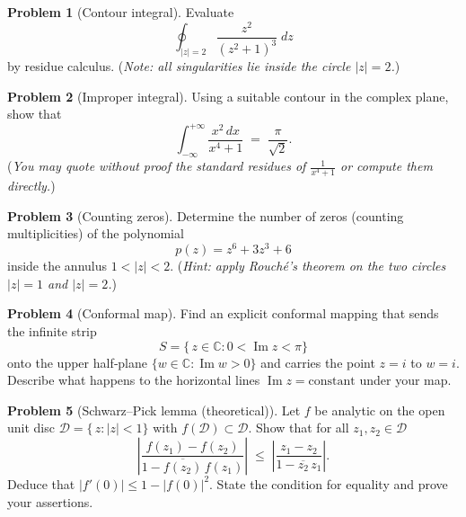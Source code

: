 \documentclass[12pt]{article}
\theoremstyle{definition} %
\newtheorem{problem}{Problem}
\theoremstyle{plain} %
\begin{document}
  \pagebreak
  \begin{problem}[Contour integral]
  Evaluate
  \[
  \oint_{\lvert z\rvert = 2}\frac{z^{2}}{(z^{2}+1)^{3}}\;dz
  \]
  by residue calculus.  (\emph{Note: all singularities lie inside the
  circle $\lvert z\rvert=2$.})
  \end{problem}
  
  \pagebreak
  \begin{problem}[Improper integral]
  Using a suitable contour in the complex plane, show that
  \[
  \int_{-\infty}^{+\infty}\frac{x^{2}\,dx}{x^{4}+1}\;=\;\frac{\pi}{\sqrt{2}}.
  \]
  (\emph{You may quote without proof the standard residues of
  $\displaystyle \frac{1}{x^{4}+1}$ or compute them directly.})
  \end{problem}
  
  \pagebreak
  \begin{problem}[Counting zeros]
  Determine the number of zeros (counting multiplicities) of the
  polynomial
  \[
  p(z)=z^{6}+3z^{3}+6
  \]
  inside the annulus $1<\lvert z\rvert<2$.
  (\emph{Hint: apply Rouché’s theorem on the two circles
  $\lvert z\rvert=1$ and $\lvert z\rvert=2$.})
  \end{problem}
  
  \pagebreak

  \begin{problem}[Conformal map]
  Find an explicit conformal mapping that sends the infinite strip
  \[
  S=\{\,z\in\mathbb{C} : 0<\operatorname{Im}z<\pi\}
  \]
  onto the upper half‑plane
  $\{w\in\mathbb{C}:\operatorname{Im}w>0\}$ and carries the point $z=i$ to
  $w=i$.  Describe what happens to the horizontal lines
  $\operatorname{Im}z=\text{constant}$ under your map.
  \end{problem}
  \pagebreak 
  \begin{problem}[Schwarz–Pick lemma (theoretical)]
  Let $f$ be analytic on the open unit disc $\mathcal{D}=\{\,z:\lvert z\rvert<1\}$
  with $f(\mathcal{D})\subset\mathcal{D}$.  Show that for all $z_{1},z_{2}\in\mathcal{D}$
  \[
  \left|\frac{f(z_{1})-f(z_{2})}{1-\overline{f(z_{2})}\,f(z_{1})}\right|
  \;\le\;
  \left|\frac{z_{1}-z_{2}}{1-\overline{z_{2}}\,z_{1}}\right|.
  \]
  Deduce that
  $\displaystyle\lvert f'(0)\rvert\le 1-\lvert f(0)\rvert^{2}$.
  State the condition for equality and prove your assertions.
  \end{problem}
  \pagebreak
\end{document}

